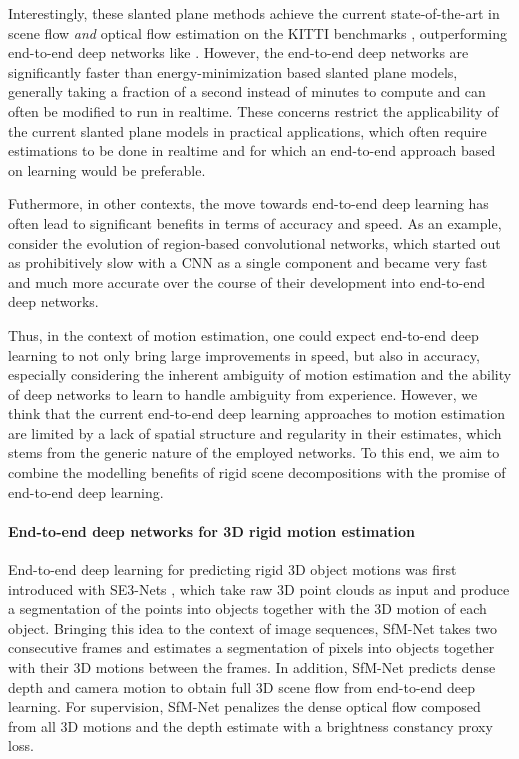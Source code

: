 Interestingly, these slanted plane methods achieve the current state-of-the-art
in scene flow \emph{and} optical flow estimation on the KITTI benchmarks \cite{KITTI2012, KITTI2015},
outperforming end-to-end deep networks like \cite{FlowNet2, SceneFlowDataset}.
However, the end-to-end deep networks are significantly faster than energy-minimization based slanted plane models,
generally taking a fraction of a second instead of minutes to compute and can often be modified to run in realtime.
These concerns restrict the applicability of the current slanted plane models in practical applications,
which often require estimations to be done in realtime and for which an end-to-end
approach based on learning would be preferable.

Futhermore, in other contexts, the move towards end-to-end deep learning has often lead
to significant benefits in terms of accuracy and speed.
As an example, consider the evolution of region-based convolutional networks, which started
out as prohibitively slow with a CNN as a single component and
became very fast and much more accurate over the course of their development into
end-to-end deep networks.

Thus, in the context of motion estimation, one could expect end-to-end deep learning to not only bring large improvements
in speed, but also in accuracy, especially considering the inherent ambiguity of motion estimation
and the ability of deep networks to learn to handle ambiguity from experience. %
However, we think that the current end-to-end deep learning approaches to motion
estimation are limited by a lack of spatial structure and regularity in their estimates,
which stems from the generic nature of the employed networks.
To this end, we aim to combine the modelling benefits of rigid scene decompositions
with the promise of end-to-end deep learning.


\paragraph{End-to-end deep networks for 3D rigid motion estimation}
End-to-end deep learning for predicting rigid 3D object motions was first introduced with
SE3-Nets \cite{SE3Nets}, which take raw 3D point clouds as input and produce a segmentation
of the points into objects together with the 3D motion of each object.
Bringing this idea to the context of image sequences, SfM-Net \cite{SfmNet} takes two consecutive frames and
estimates a segmentation of pixels into objects together with their 3D motions between the frames.
In addition, SfM-Net predicts dense depth and camera motion to obtain full 3D scene flow from end-to-end deep learning.
For supervision, SfM-Net penalizes the dense optical flow composed from all 3D motions and the depth estimate
with a brightness constancy proxy loss.
